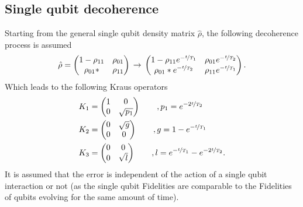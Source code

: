 \subsection{Single qubit decoherence}\label{sec:single_qubit_noise}
Starting from the general single qubit density matrix $\hat{\rho}$, the following decoherence process \cite{Geller2013} is assumed 
\begin{align}
\hat{\rho}=\begin{pmatrix}
1-\rho_{11} & \rho_{01}\\
\rho_{01}* & \rho_{11}
\end{pmatrix} \,\rightarrow \,\begin{pmatrix}
1-\rho_{11}e^{-\nicefrac{t}{T_1}} & \rho_{01}e^{-\nicefrac{t}{T_2}}\\
\rho_{01}*e^{-\nicefrac{t}{T_2}} & \rho_{11}e^{-\nicefrac{t}{T_1}}
\end{pmatrix}.\nonumber
\end{align}
Which leads to the following Kraus operators 
\begin{align}
K_1&=\begin{pmatrix}1& 0\\0 &\sqrt{p_1}\end{pmatrix} \qquad , p_1=e^{-2\nicefrac{t}{T_2}}\\
K_2&=\begin{pmatrix}0 &\sqrt{g}\\ 0 &0\end{pmatrix}  \qquad , g=1-e^{-\nicefrac{t}{T_1}}\\
K_3&=\begin{pmatrix}0 &0\\ 0& \sqrt{l}\end{pmatrix}  \qquad , l=e^{-\nicefrac{t}{T_1}}-e^{-2\nicefrac{t}{T_2}}.\nonumber
\end{align}
It is assumed that the error is independent of the action of a single qubit interaction or not (as the single qubit Fidelities are comparable to the Fidelities of qubits evolving for the same amount of time). 
